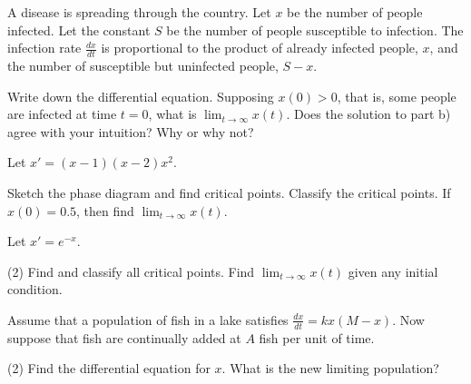 \begin{exercise}
A disease is spreading through the country.  Let $x$ be the number of people
infected.  Let the constant $S$ be the number of people susceptible to
infection.  The infection rate $\frac{dx}{dt}$ is proportional to the product
of already infected people, $x$, and the number of susceptible but
uninfected people, $S-x$.
\begin{tasks}
\task Write down the differential equation.
\task Supposing $x(0) > 0$, that is, some people are infected at time $t=0$,
what is
$\displaystyle \lim_{t\to\infty} x(t)$.
\task Does the solution to part b) agree with your intuition?  Why or why not?
\end{tasks}
\end{exercise}



\begin{exercise}
Let $x'=(x-1)(x-2)x^2$.
\begin{tasks}
\task Sketch the phase diagram and find critical
points.
\task Classify the critical points.
\task If $x(0)=0.5$, then find $\displaystyle \lim_{t\to\infty} x(t)$.
\end{tasks}
\end{exercise}

\begin{exercise}
Let $x'=e^{-x}$.
\begin{tasks}(2)
\task Find and classify all critical points.
\task Find $\displaystyle \lim_{t\to\infty} x(t)$ given any 
initial condition.
\end{tasks}
\end{exercise}

\begin{exercise}
Assume that a population of fish in a lake satisfies
$\frac{dx}{dt} = kx(M-x)$.  Now suppose that fish are continually added
at $A$ fish per unit of time.
\begin{tasks}(2)
\task Find the differential equation for $x$.
\task What is the new limiting population?
\end{tasks}
\end{exercise}

